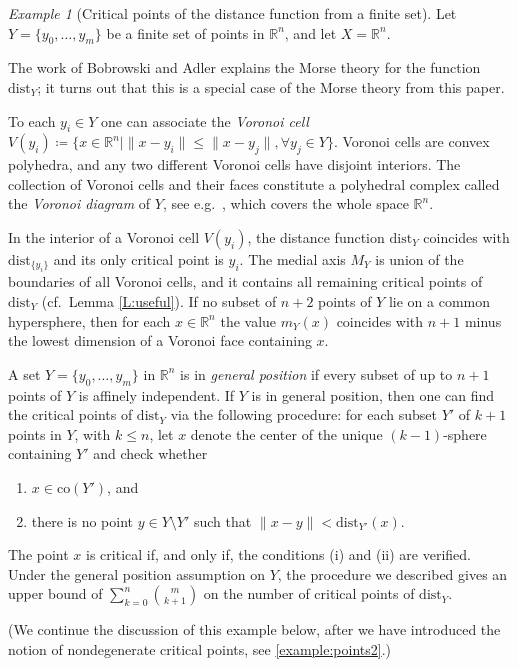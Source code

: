 \documentclass{amsart}
\newcommand{\dd}{\mathrm{dist}}
\def\lini{k}
\theoremstyle{definition}
\theoremstyle{remark}
\newtheorem{example}[subsubsection]{Example}
\begin{document}
\begin{example}[Critical points of the distance function from a finite set]
\label{ex:finiteY}
Let $Y=\{y_0,\ldots ,y_m \}$ be a finite set of points in $\mathbb{R}^n$, and let $X=\mathbb{R}^n$.

The work of Bobrowski and
Adler \cite{bobrowski2014distance} explains the Morse theory for the function  $\dd_Y$; it turns out that this is a special case of the Morse theory from this paper. 

To each $y_i\in Y$ one can associate the \emph{Voronoi cell} $V(y_i) \coloneqq \{ x \in \mathbb{R}^n \mid \| x-y_i \| \leq \| x-y_j \|, \forall y_j \in Y \}$. Voronoi cells are convex polyhedra, and any two different Voronoi cells have disjoint interiors. The collection of Voronoi cells and their faces constitute a polyhedral complex \cite{ziegler2012lectures} called the \emph{Voronoi diagram} of $Y$, see e.g.\ 
\cite{boissonnat2018geometric}, which covers the whole space $\mathbb{R}^n$.

In the interior of a Voronoi cell $V(y_i)$, the distance function $\dd_Y$  coincides with $\dd_{\{y_i\}}$ and its only critical point is $y_i$. The medial axis $M_Y$ is union of the boundaries of all Voronoi cells, and it contains all remaining critical points of $\dd_Y$ (cf.\ Lemma \ref{L:useful}). 
If no subset of $n+2$ points of $Y$ lie on a common hypersphere, then for each $x\in \mathbb{R}^n$ the value $m_Y(x)$ coincides with $n+1$ minus the lowest dimension of a Voronoi face containing $x$.

A set $Y=\{y_0,\ldots ,y_m \}$ in $\mathbb{R}^n$ is in \emph{general position} if every subset of up to $n+1$ points of $Y$ is affinely independent.
If $Y$ is in general position, then one can find the critical points of $\dd_Y$ via the following procedure: for each subset $Y'$ of $\lini+1$ points in $Y$, with $\lini \le n$, let $x$ denote the center of the unique $(\lini-1)$-sphere containing $Y'$ and check whether
\begin{enumerate}[label=(\roman*), align=left]
\item $x \in \mathrm{co} (Y')$, and
\item there is no point $y\in Y\setminus Y'$ such that $\| x-y\| < \dd_{Y'} (x)$.
\end{enumerate}
The point $x$ is critical if, and only if, the conditions (i) and (ii) are verified. Under the general position assumption on $Y$, the procedure we described gives an upper bound of $\sum_{\lini = 0}^{n} \binom{m}{\lini + 1}$ on the number of critical points of $\dd_Y$.

(We continue the discussion of this example below, after we have introduced the notion of nondegenerate critical points, see \cref{example:points2}.)
\end{example}
\end{document}
